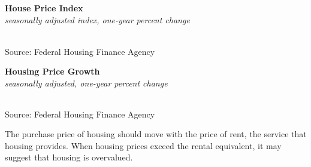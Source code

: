 \documentclass{report}
\makeatletter
\newcommand{\tbllink}[1]{\href{https://raw.githubusercontent.com/bdecon/US-chartbook/master/chartbook/data/#1}{\faTable}}
\newcommand*\short[1]{\expandafter\@gobbletwo\number\numexpr#1\relax}
\newcommand{\dateaxisticks}{
		date coordinates in=x, axis line style={draw=none},
		xmax={2021-06-15},
		max space between ticks=40,	    
		xtick={{1990-01-01}, {1992-01-01}, {1994-01-01}, 
			{1996-01-01}, {1998-01-01}, {2000-01-01}, 
			{2002-01-01}, {2004-01-01}, {2006-01-01},
			{2008-01-01}, {2010-01-01}, {2012-01-01}, {2014-01-01},
		    {2016-01-01}, {2018-01-01}, {2020-01-01}},
		minor xtick={{1989-01-01}, {1991-01-01}, {1993-01-01},
			{1995-01-01}, {1997-01-01}, {1999-01-01}, 
			{2001-01-01}, {2003-01-01}, {2005-01-01}, {2007-01-01},
		    {2009-01-01}, {2011-01-01}, {2013-01-01}, {2015-01-01},
		    {2017-01-01}, {2019-01-01}, {2021-01-01}},
		enlarge y limits={0.06}, enlarge x limits={0.01},
		}
\newcommand{\bbar}[2]{extra #1 ticks = {{#2}}, extra #1 tick labels = ,
		extra #1 tick style = {grid=major, grid style={thick, black!25}},}
\newcommand{\thickline}[4]{\addplot[ultra thick, no markers, color=#1] 
		table [x=#2, y=#3, col sep=comma] {#4};	}
\newcommand{\rebars}{
		\fill[color=black!10] (axis cs:{2007-12-01},\pgfkeysvalueof{/pgfplots/ymin}) rectangle 
			(axis cs:{2009-07-01}, \pgfkeysvalueof{/pgfplots/ymax});
		\fill[color=black!10] (axis cs:{2001-03-01},\pgfkeysvalueof{/pgfplots/ymin}) rectangle 
			(axis cs:{2001-11-01}, \pgfkeysvalueof{/pgfplots/ymax});
		\fill[color=black!10] (axis cs:{2020-02-01},\pgfkeysvalueof{/pgfplots/ymin}) rectangle 
			(axis cs:{2021-06-15}, \pgfkeysvalueof{/pgfplots/ymax});}
\makeatother
\begin{document}
{\begin{minipage}{0.76\textwidth}
\normalsize \textbf{House Price Index}\\
\footnotesize{\textit{seasonally adjusted index, one-year percent change}}\\
\hspace*{-2mm} \\
\footnotesize{Source: Federal Housing Finance Agency} \hfill \tbllink{hpi.csv}
\vspace{2mm}

\normalsize{\textbf{Housing Price Growth}}\\
\footnotesize{\textit{seasonally adjusted, one-year percent change}}\\
\hspace*{-3mm} \noindent {} \setlength{\tabcolsep}{3.1pt} \color{black!90}
		{\renewcommand{\arraystretch}{1.5}
		 \begin{tabular}{p{24mm} R{7.1mm} R{7.1mm} R{7.1mm} R{7.1mm} R{7.1mm} R{7.1mm} R{7.1mm} R{12.0mm} R{10.8mm}}
			  \hline
		\end{tabular}}
		
	\vspace{-2mm}
\footnotesize{Source: Federal Housing Finance Agency} \hfill \tbllink{hpi.csv}
\end{minipage}
\vspace{6mm}

\begin{minipage}{0.33\textwidth}
\small The purchase price of housing should move with the price of rent, the service that housing provides. When housing prices exceed the rental equivalent, it may suggest that housing is overvalued. 


\end{minipage}}
\end{document}
